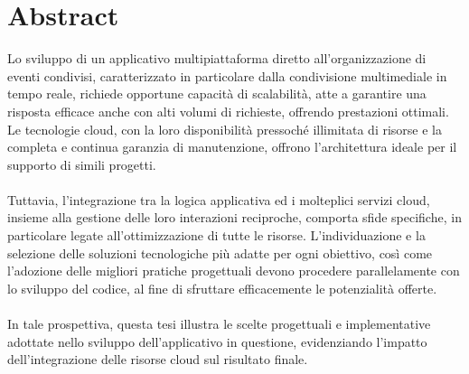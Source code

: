 

\section*{Abstract}


Lo sviluppo di un applicativo multipiattaforma diretto all’organizzazione di eventi condivisi, caratterizzato in particolare dalla condivisione multimediale in tempo reale, 
richiede opportune capacità di scalabilità, atte a garantire una risposta efficace anche con alti volumi di richieste, offrendo prestazioni ottimali. 
Le tecnologie cloud, con la loro disponibilità pressoché illimitata di risorse e la completa e continua garanzia  di manutenzione, 
offrono l'architettura ideale per il supporto di simili progetti.\\
\\
Tuttavia, l'integrazione tra la logica applicativa ed i molteplici servizi cloud, 
insieme alla gestione delle loro interazioni reciproche, comporta sfide specifiche, in particolare legate all'ottimizzazione di tutte le risorse.
L’individuazione e la selezione delle soluzioni tecnologiche più adatte per ogni obiettivo, 
così come l'adozione delle migliori pratiche progettuali devono procedere parallelamente con lo sviluppo del codice, al fine di sfruttare efficacemente le potenzialità offerte.\\
\\
In tale prospettiva, questa tesi illustra le scelte progettuali e implementative adottate nello sviluppo dell'applicativo in questione, 
evidenziando l’impatto dell'integrazione delle risorse cloud sul risultato finale.\\


\clearpage